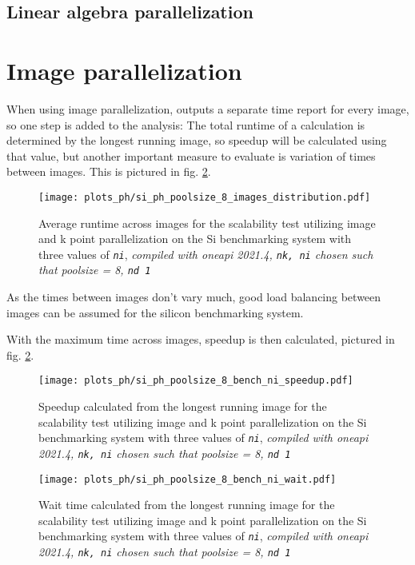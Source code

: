 \documentclass[main.tex]{subfiles}
\begin{document}
\subsection{Linear algebra parallelization}

\section{Image parallelization}\label{sec:scaling_ph_images}

When using image parallelization, \QE outputs a separate time report for every image, so one step is added to the analysis:
The total runtime of a calculation is determined by the longest running image, so speedup will be calculated using that value, but another important measure to evaluate is variation of times between images.
This is pictured in fig. \ref{fig:scaling_ph_ni_poolsize_8_si}.

\begin{figure}[ht!]
    \centering
    \texttt{[image: plots\_ph/si\_ph\_poolsize\_8\_images\_distribution.pdf]}
    \caption{Average runtime across images for the scalability test utilizing image and k point parallelization on the Si benchmarking system with three values of \emph{\texttt{ni}}, \emph{\QE compiled with \gls{oneapi} 2021.4, \texttt{nk, ni} chosen such that poolsize = 8, \texttt{nd 1}}}
    \label{fig:scaling_ph_ni_poolsize_8_si_distribution}
\end{figure}
As the times between images don't vary much, good load balancing between images can be assumed for the silicon benchmarking system.

With the maximum time across images, speedup is then calculated, pictured in fig. \ref{fig:scaling_ph_ni_poolsize_8_si}.

\begin{figure}[ht!]
    \centering
    \texttt{[image: plots\_ph/si\_ph\_poolsize\_8\_bench\_ni\_speedup.pdf]}
    \caption{Speedup calculated from the longest running image for the scalability test utilizing image and k point parallelization on the Si benchmarking system with three values of \emph{\texttt{ni}}, \emph{\QE compiled with \gls{oneapi} 2021.4, \texttt{nk, ni} chosen such that poolsize = 8, \texttt{nd 1}}}
    \label{fig:scaling_ph_ni_poolsize_8_si}
\end{figure}


\begin{figure}[ht!]
    \centering
    \texttt{[image: plots\_ph/si\_ph\_poolsize\_8\_bench\_ni\_wait.pdf]}
    \caption{Wait time calculated from the longest running image for the scalability test utilizing image and k point parallelization on the Si benchmarking system with three values of \emph{\texttt{ni}}, \emph{\QE compiled with \gls{oneapi} 2021.4, \texttt{nk, ni} chosen such that poolsize = 8, \texttt{nd 1}}}
    \label{fig:scaling_ph_ni_poolsize_8_si_wait}
\end{figure}
\end{document}
